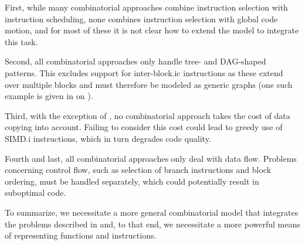 First, while many combinatorial approaches combine \gls{instruction
  selection} with \gls{instruction scheduling}, none combines \gls{instruction
  selection} with \gls{global code motion}, and for most of these it is not
clear how to extend the model to integrate this task.

Second, all combinatorial approaches only handle \gls{tree}- and
\gls{DAG}-shaped \glspl{pattern}.
%
This excludes support for \gls{inter-block.ic} \glspl{instruction} as these
extend over multiple \glspl{block} and must therefore be modeled as generic
\glspl{graph} (one such example is given in  on
).

Third, with the exception of \textcite{TanakaEtAl:2003}, no combinatorial
approach takes the cost of \gls{data copying} into account.
%
Failing to consider this cost could lead to greedy use of \gls{SIMD.i}
\glspl{instruction}, which in turn degrades code quality.

Fourth and last, all combinatorial approaches only deal with data flow.
%
Problems concerning control flow, such as selection of branch
\glspl{instruction} and \gls{block ordering}, must be handled separately, which
could potentially result in suboptimal code.

To summarize, we necessitate a more general combinatorial model that integrates
the problems described in  and, to that end, we
necessitate a more powerful means of representing \glspl{function} and
\glspl{instruction}.
